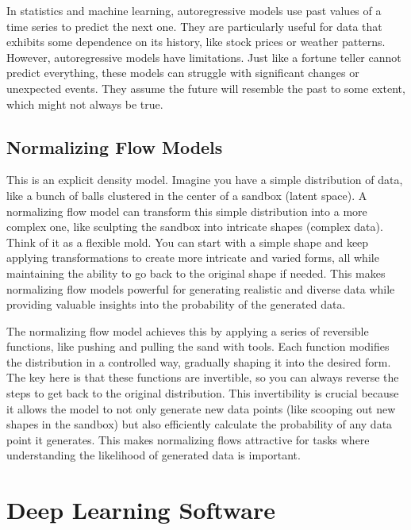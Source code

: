 \documentclass[10pt, letterpaper, twoside]{article}
\begin{document}
In statistics and machine learning, autoregressive models use past values of a time series to predict the next one. They are particularly useful for data that exhibits some dependence on its history, like stock prices or weather patterns. However, autoregressive models have limitations. Just like a fortune teller cannot predict everything, these models can struggle with significant changes or unexpected events. They assume the future will resemble the past to some extent, which might not always be true.

\subsection{Normalizing Flow Models}\label{sec:normalizing_flow_models}

This is an explicit density model. Imagine you have a simple distribution of data, like a bunch of balls clustered in the center of a sandbox (latent space). A normalizing flow model can transform this simple distribution into a more complex one, like sculpting the sandbox into intricate shapes (complex data). Think of it as a flexible mold. You can start with a simple shape and keep applying transformations to create more intricate and varied forms, all while maintaining the ability to go back to the original shape if needed. This makes normalizing flow models powerful for generating realistic and diverse data while providing valuable insights into the probability of the generated data.

The normalizing flow model achieves this by applying a series of reversible functions, like pushing and pulling the sand with tools. Each function modifies the distribution in a controlled way, gradually shaping it into the desired form. The key here is that these functions are invertible, so you can always reverse the steps to get back to the original distribution. This invertibility is crucial because it allows the model to not only generate new data points (like scooping out new shapes in the sandbox) but also efficiently calculate the probability of any data point it generates. This makes normalizing flows attractive for tasks where understanding the likelihood of generated data is important.

\section{Deep Learning Software}\label{sec:deep_learning_software}
\end{document}
